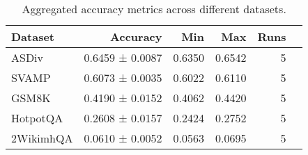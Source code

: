 \begin{table}
\centering
\caption{Aggregated accuracy metrics across different datasets.}
\label{tab:accuracy_metrics}
\begin{tabular}{lrrrrr}
\toprule
  Dataset &        Accuracy &    Min &    Max &  Runs \\
\midrule
    ASDiv & 0.6459 ± 0.0087 & 0.6350 & 0.6542 &     5 \\
    SVAMP & 0.6073 ± 0.0035 & 0.6022 & 0.6110 &     5 \\
    GSM8K & 0.4190 ± 0.0152 & 0.4062 & 0.4420 &     5 \\
 HotpotQA & 0.2608 ± 0.0157 & 0.2424 & 0.2752 &     5 \\
2WikimhQA & 0.0610 ± 0.0052 & 0.0563 & 0.0695 &     5 \\
\bottomrule
\end{tabular}
\end{table}
